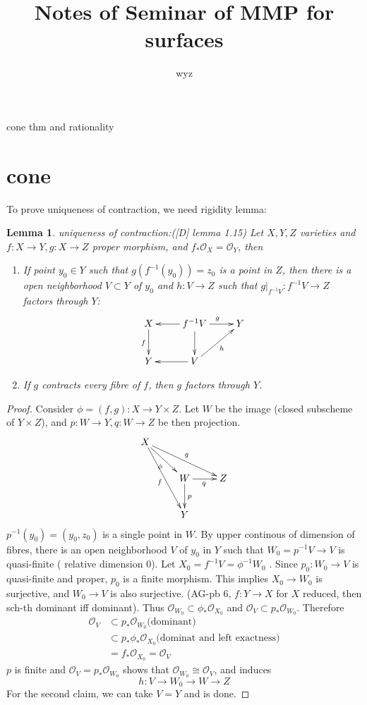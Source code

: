 \documentclass{article}
\title{Notes of Seminar of MMP for surfaces}
\author{wyz}
\date{}
\newtheorem{lem}[defn]{Lemma}
\begin{document}
	 cone thm and rationality

\section{cone}

To prove uniqueness of contraction, we need rigidity lemma:
\begin{lem}
	uniqueness of contraction:([D] lemma 1.15) Let $ X,Y,Z $ varieties and $ f:X\to Y,g:X\to Z $ proper morphism, and $ f_*\mathcal{O}_X=\mathcal{O}_Y $, then
	\begin{enumerate}
		\item If point $ y_0\in Y $ such that $ g(f^{-1}(y_0))=z_0 $ is a point in $ Z $, then there is a open neighborhood $ V\subset Y $ of $ y_0 $  and $ h:V\to Z $ such that $ g|_{f^{-1}V}:f^{-1}V\to Z $ factors through $ Y $:
		$$ \xymatrix{
			X\ar[d]_{f}&f^{-1}V\ar[l]\ar[d]\ar[r]^{g}&Y\\
			Y&V\ar[l]\ar[ur]_{h}
	} $$
		\item If $ g $ contracts every fibre of $ f $, then $ g $ factors through $ Y $.
	\end{enumerate}
\end{lem}
\begin{proof}
	Consider $ \phi=(f,g):X\to Y\times Z $. Let  $ W $ be the image (closed subscheme of $ Y\times Z $), and  $ p:W\to Y,q:W\to Z $ be then projection.
	$$ \xymatrix{
		X\ar[rrd]^g\ar[ddr]_f\ar[rd]_{\phi}\\
		&W\ar[d]^p\ar[r]_q&Z\\
		&Y
		} $$
	$ p^{-1}(y_0)=(y_0,z_0)  $ is a single point in $ W $. By upper continous of dimension of fibres, there is an open neighborhood $ V $ of $ y_0 $ in $ Y $ such that $ W_0=p^{-1}V\to V $ is quasi-finite ( relative dimension 0). Let $ X_0=f^{-1}V=\phi^{-1}W_0 $ . Since  $ p_0:W_0\to V $ is quasi-finite and proper, $ p_0 $ is a finite morphism. This implies $ X_0\to W_0 $ is surjective, and $ W_0\to V $ is also surjective. (AG-pb 6, $ f:Y\to X $ for $ X $ reduced, then sch-th dominant iff dominant). Thus $ \mathcal{O}_{W_0}\subset \phi_*\mathcal{O}_{X_0} $ and $ \mathcal{O}_V\subset p_*\mathcal{O}_{W_0}  $. Therefore
	\begin{equation*}
	\begin{aligned}
	\mathcal{O}_{V}&\subset p_*\mathcal{O}_{W_0} \text{(dominant)}\\
	&\subset p_*\phi_* \mathcal{O}_{X_0} \text{(dominat and left exactness)}\\
	&=f_*\mathcal{O}_{X_0}=\mathcal{O}_V
	\end{aligned}
	\end{equation*}
	$ p $ is finite and $ \mathcal{O}_{V}= p_*\mathcal{O}_{W_0} $ shows that $ \mathcal{O}_{W_0}\cong \mathcal{O}_V $, and induces $$ h:V\to W_0\to W\to Z $$
	For the second claim, we can take $ V=Y $ and is done.
\end{proof}
\end{document}
